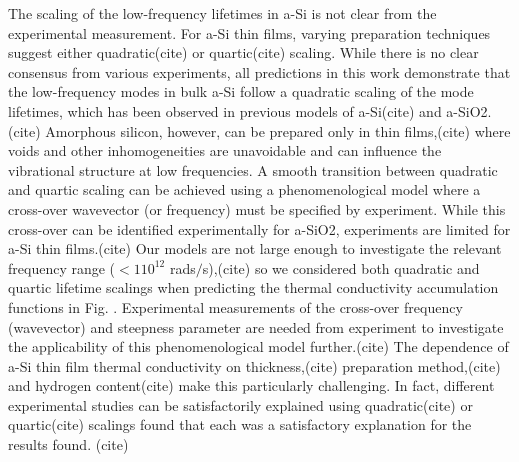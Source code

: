 \documentclass[aps,prb,onecolumn,preprint,superscriptaddress,footinbib,amsmath,amssymb,floatfix]{revtex4}
\begin{document}
The scaling of the low-frequency lifetimes 
in a-Si is not clear from the experimental measurement. 
For a-Si thin films, varying preparation techniques suggest either 
quadratic(cite) or quartic(cite) scaling. 
While there is no clear consensus from various experiments, all predictions in this 
work demonstrate that  
the low-frequency modes in bulk a-Si follow a quadratic scaling 
of the mode lifetimes, which has been observed in previous models of 
a-Si(cite) and 
a-SiO2.(cite)
Amorphous silicon, however, can be
prepared only in thin films,(cite) where voids and other 
inhomogeneities are unavoidable\cite{li_effect_2011} and can influence the 
vibrational structure at low frequencies.
\cite{feldman_tight-binding_2004,liu_high_2009} 
A smooth transition between quadratic and quartic scaling can be 
achieved using a phenomenological model where a cross-over wavevector 
(or frequency) must be specified by experiment.
\cite{baldi_elastic_2011} While this cross-over can be identified 
experimentally for a-SiO2,\cite{masciovecchio_evidence_2006} 
experiments are limited for a-Si thin films.(cite) Our models 
are not large enough to investigate the relevant frequency range 
($< 1 10^{12}$ rads$/$s),(cite) so we considered both 
quadratic and quartic lifetime scalings when predicting 
the thermal conductivity accumulation functions in Fig. . 
Experimental measurements of the cross-over frequency (wavevector) and 
steepness parameter are needed from experiment to investigate the 
applicability of this phenomenological model further.(cite) 
The dependence 
of a-Si thin film thermal conductivity on thickness,(cite) 
preparation method,(cite) 
and hydrogen content(cite) make this particularly challenging. In fact, 
different experimental studies can be satisfactorily explained using 
quadratic(cite) or quartic(cite) scalings 
found that each was a satisfactory explanation for the results found.
(cite) 
\end{document}
